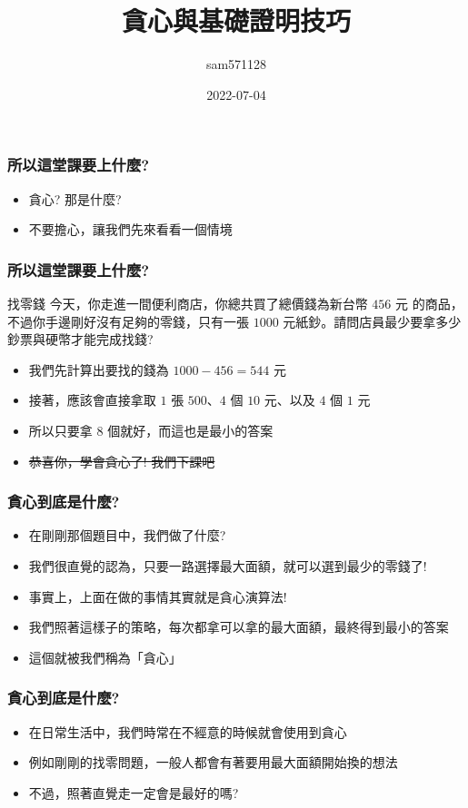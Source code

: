 \documentclass[aspectratio=169]{beamer}
\title{貪心與基礎證明技巧}
\author{sam571128}
\date{2022-07-04}
\begin{document}
\frame{\titlepage}

\begin{frame}
\frametitle{所以這堂課要上什麼?}
    \begin{itemize}
    \item<1-> 貪心? 那是什麼?
    \item<2-> 不要擔心，讓我們先來看看一個情境
    \end{itemize}
\end{frame}

\begin{frame}
\frametitle{所以這堂課要上什麼?}
    \begin{block}{找零錢}
    今天，你走進一間便利商店，你總共買了總價錢為新台幣 $456$ 元 的商品，不過你手邊剛好沒有足夠的零錢，只有一張 $1000$ 元紙鈔。請問店員最少要拿多少鈔票與硬幣才能完成找錢?
    \end{block}
    \begin{itemize}
    \item<1-> 我們先計算出要找的錢為 $1000 - 456 = 544$ 元
    \item<2-> 接著，應該會直接拿取 $1$ 張 $500$、$4$ 個 $10$ 元、以及 $4$ 個 $1$ 元
    \item<3-> 所以只要拿 $8$ 個就好，而這也是最小的答案
    \item<4-> \sout{恭喜你，學會貪心了! 我們下課吧}
    \end{itemize}
\end{frame}

\begin{frame}
\frametitle{貪心到底是什麼?}
    \begin{itemize}
    \item<1-> 在剛剛那個題目中，我們做了什麼?
    \item<2-> 我們很直覺的認為，只要一路選擇最大面額，就可以選到最少的零錢了!
    \item<3-> 事實上，上面在做的事情其實就是貪心演算法!
    \item<4-> 我們照著這樣子的策略，每次都拿可以拿的最大面額，最終得到最小的答案
    \item<5-> 這個就被我們稱為「貪心」
    \end{itemize}
\end{frame}

\begin{frame}
\frametitle{貪心到底是什麼?}
    \begin{itemize}
    \item<1-> 在日常生活中，我們時常在不經意的時候就會使用到貪心
    \item<2-> 例如剛剛的找零問題，一般人都會有著要用最大面額開始換的想法
    \item<3-> 不過，照著直覺走一定會是最好的嗎?
    \end{itemize}
\end{frame}
\end{document}
